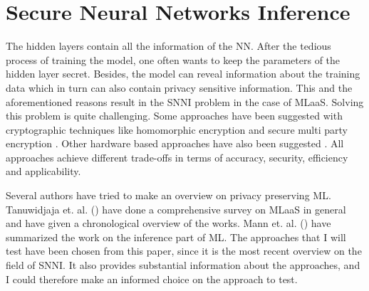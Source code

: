 \documentclass[../thesis.tex]{subfiles}
\begin{document}



\section{Secure Neural Networks Inference}
The hidden layers contain all the information of the NN. After the tedious process of training the model, one often wants to keep the parameters of the hidden layer secret. Besides, the model can reveal information about the training data \parencite{qayyum2020} which in turn can also contain privacy sensitive information. This and the aforementioned reasons result in the SNNI problem in the case of MLaaS. Solving this problem is quite challenging. Some approaches have been suggested with cryptographic techniques like homomorphic encryption \parencite{rivest1978} and secure multi party encryption \parencite{yao1982, yao1986}. Other hardware based approaches have also been suggested \parencite{deepsecure}. All approaches achieve different trade-offs in terms of accuracy, security, efficiency and applicability. 

Several authors have tried to make an overview on privacy preserving ML. Tanuwidjaja et. al. (\citeyear{tanuwidjaja2020}) have done a comprehensive survey on MLaaS in general and have given a chronological overview of the works. Mann et. al. (\citeyear{mann22}) have summarized the work on the inference part of ML. The approaches that I will test have been chosen from this paper, since it is the most recent overview on the field of SNNI. It also provides substantial information about the approaches, and I could therefore make an informed choice on the approach to test.  
\end{document}
